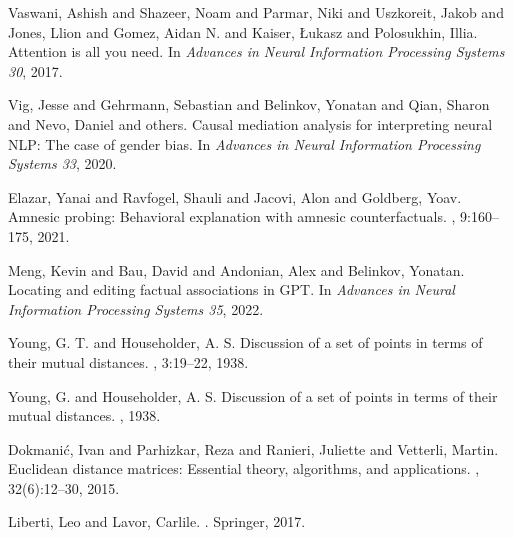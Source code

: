 \documentclass[11pt]{article}
\newcommand{\1}{\mathbf{1}}
\begin{document}
\begin{thebibliography}{99}
Vaswani, Ashish and Shazeer, Noam and Parmar, Niki and Uszkoreit, Jakob and Jones, Llion and Gomez, Aidan N. and Kaiser, \L{}ukasz and Polosukhin, Illia.
\newblock Attention is all you need.
\newblock In {\em Advances in Neural Information Processing Systems 30}, 2017.

Vig, Jesse and Gehrmann, Sebastian and Belinkov, Yonatan and Qian, Sharon and Nevo, Daniel and others.
\newblock Causal mediation analysis for interpreting neural NLP: The case of gender bias.
\newblock In {\em Advances in Neural Information Processing Systems 33}, 2020.

Elazar, Yanai and Ravfogel, Shauli and Jacovi, Alon and Goldberg, Yoav.
\newblock Amnesic probing: Behavioral explanation with amnesic counterfactuals.
, 9:160--175, 2021.

Meng, Kevin and Bau, David and Andonian, Alex and Belinkov, Yonatan.
\newblock Locating and editing factual associations in GPT.
\newblock In {\em Advances in Neural Information Processing Systems 35}, 2022.

Young, G. T. and Householder, A. S.
\newblock Discussion of a set of points in terms of their mutual distances.
, 3:19--22, 1938.

Young, G. and Householder, A. S.
\newblock Discussion of a set of points in terms of their mutual distances.
, 1938.

Dokmani\'c, Ivan and Parhizkar, Reza and Ranieri, Juliette and Vetterli, Martin.
\newblock Euclidean distance matrices: Essential theory, algorithms, and applications.
, 32(6):12--30, 2015.

Liberti, Leo and Lavor, Carlile.
.
\newblock Springer, 2017.

\end{thebibliography}
\end{document}
